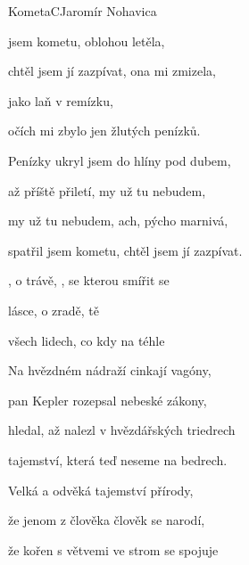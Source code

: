 \setcounter{page}{43}
\begin{song}{Kometa}{C}{Jaromír Nohavica}

\begin{SBVerse}

 jsem kometu, oblohou letěla,

chtěl jsem jí zazpívat, ona mi zmizela,

 jako laň  v remízku,

očích mi zbylo jen  žlutých penízků.

\end{SBVerse}

\begin{SBVerse}

Penízky ukryl jsem do hlíny pod dubem,

až příště přiletí, my už tu nebudem,

my už tu nebudem, ach, pýcho marnivá,

spatřil jsem kometu, chtěl jsem jí zazpívat.

\end{SBVerse}

\begin{SBChorus}

, o trávě, , se kterou smířit  se

lásce, o zradě, tě

všech lidech, co kdy  na téhle 

\end{SBChorus}

\begin{SBVerse}

Na hvězdném nádraží cinkají vagóny,

pan Kepler rozepsal nebeské zákony,

hledal, až nalezl v hvězdářských triedrech

tajemství, která teď neseme na bedrech.

\end{SBVerse}

\begin{SBVerse}

Velká a odvěká tajemství přírody,

že jenom z člověka člověk se narodí,

že kořen s větvemi ve strom se spojuje


\end{SBVerse}
\end{song}
